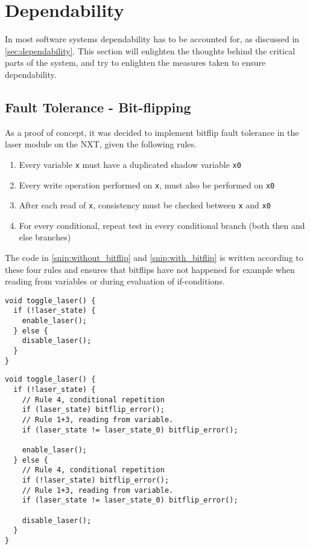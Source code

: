 \section{Dependability}\label{Design:Dependability}
In most software systems dependability has to be accounted for, as discussed in \autoref{sec:dependability}.
This section will enlighten the thoughts behind the critical parts of the system, and try to enlighten the measures taken to ensure dependability.

\subsection{Fault Tolerance - Bit-flipping}
As a proof of concept, it was decided to implement bitflip fault tolerance in the laser module on the NXT, given the following rules.

\begin{enumerate}
  \item Every variable \texttt{x} must have a duplicated shadow variable \texttt{x0} \cite{errorDetectionSoft}
  \item Every write operation performed on \texttt{x}, must also be performed on \texttt{x0} \cite{errorDetectionSoft}
  \item After each read of \texttt{x}, consistency must be checked between \texttt{x} and \texttt{x0} \cite{errorDetectionSoft}
  \item For every conditional, repeat test in every conditional branch (both then and else branches) \cite{errorDetectionSoft}
\end{enumerate}

The code in \autoref{snip:without_bitflip} and \autoref{snip:with_bitflip} is written according to these four rules and ensures that bitflips have not happened for example when reading from variables or during evaluation of if-conditions.

\noindent\begin{minipage}{.45\textwidth}
\begin{lstlisting}[label={snip:without_bitflip},caption={Without~bitflip-security},frame=tlrb,numbers=none]
void toggle_laser() {
  if (!laser_state) {
    enable_laser();
  } else {
    disable_laser();
  }
}
\end{lstlisting}
\end{minipage}\hfill
\begin{minipage}{.45\textwidth}
\begin{lstlisting}[label={snip:with_bitflip},caption={With bitflip-security},frame=tlrb,numbers=none]
void toggle_laser() {
  if (!laser_state) {
    // Rule 4, conditional repetition
    if (laser_state) bitflip_error();
    // Rule 1+3, reading from variable.
    if (laser_state != laser_state_0) bitflip_error();

    enable_laser();
  } else {
    // Rule 4, conditional repetition
    if (!laser_state) bitflip_error();
    // Rule 1+3, reading from variable.
    if (laser_state != laser_state_0) bitflip_error();

    disable_laser();
  }
}
\end{lstlisting}
\end{minipage}

